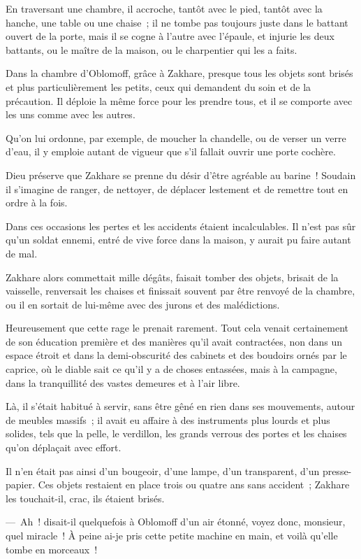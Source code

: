 \documentclass[french,twoside]{book} %
\begin{document}
En traversant une chambre, il accroche, tantôt avec le pied, tantôt avec la hanche, une table ou une chaise ; il ne tombe pas toujours juste dans le battant ouvert de la porte, mais il se cogne à l’autre avec l’épaule, et injurie les deux battants, ou le maître de la maison, ou le charpentier qui les a faits.\par
Dans la chambre d’Oblomoff, grâce à Zakhare, presque tous les objets sont brisés et plus particulièrement les petits, ceux qui demandent du soin et de la précaution. Il déploie la même force pour les prendre tous, et il se comporte avec les uns comme avec les autres.\par
Qu’on lui ordonne, par exemple, de moucher la chandelle, ou de verser un verre d’eau, il y emploie autant de vigueur que s’il fallait ouvrir une porte cochère.\par
Dieu préserve que Zakhare se prenne du désir d’être agréable au barine ! Soudain il s’imagine de ranger, de nettoyer, de déplacer lestement et de remettre tout en ordre à la fois.\par
Dans ces occasions les pertes et les accidents étaient incalculables. Il n’est pas sûr qu’un soldat ennemi, entré de vive force dans la maison, y aurait pu faire autant de mal.\par
Zakhare alors commettait mille dégâts, faisait tomber des objets, brisait de la vaisselle, renversait les chaises et finissait souvent par être renvoyé de la chambre, ou il en sortait de lui-même avec des jurons et des malédictions.\par
Heureusement que cette rage le prenait rarement. Tout cela venait certainement de son éducation première et des manières qu’il avait contractées, non dans un espace étroit et dans la demi-obscurité des cabinets et des boudoirs ornés par le caprice, où le diable sait ce qu’il y a de choses entassées, mais à la campagne, dans la tranquillité des vastes demeures et à l’air libre.\par
Là, il s’était habitué à servir, sans être gêné en rien dans ses mouvements, autour de meubles massifs ; il avait eu affaire à des instruments plus lourds et plus solides, tels que la pelle, le verdillon, les grands verrous des portes et les chaises qu’on déplaçait avec effort.\par
Il n’en était pas ainsi d’un bougeoir, d’une lampe, d’un transparent, d’un presse-papier. Ces objets restaient en place trois ou quatre ans sans accident ; Zakhare les touchait-il, crac, ils étaient brisés.\par
— Ah ! disait-il quelquefois à Oblomoff d’un air étonné, voyez donc, monsieur, quel miracle ! À peine ai-je pris cette petite machine en main, et voilà qu’elle tombe en morceaux !\par
\end{document}
